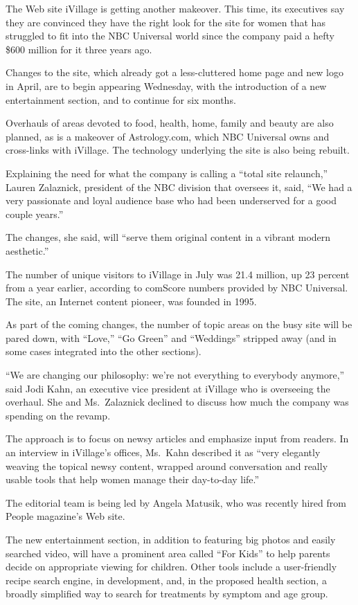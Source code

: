 ﻿\documentclass[12pt]{article}
\begin{document}
The Web site iVillage is getting another makeover. This time, its executives say they are convinced
they have the right look for the site for women that has struggled to fit into the NBC Universal
world since the company paid a hefty\cite{hefty} \$600 million for it three years ago.

Changes to the site, which already got a less-cluttered home page and new logo in April, are to
begin appearing Wednesday, with the introduction of a new entertainment section, and to continue for
six months.

Overhauls of areas devoted to food, health, home, family and beauty are also planned, as is a
makeover of Astrology.com, which NBC Universal owns and cross-links with iVillage. The technology
underlying the site is also being rebuilt.

Explaining the need for what the company is calling a ``total site relaunch,'' Lauren Zalaznick,
president of the NBC division that oversees it, said, ``We had a very passionate and loyal audience
base who had been underserved for a good couple years.''

The changes, she said, will ``serve them original content in a vibrant modern aesthetic.''

The number of unique visitors to iVillage in July was 21.4 million, up 23 percent from a year
earlier, according to comScore numbers provided by NBC Universal. The site, an Internet content
pioneer, was founded in 1995.

As part of the coming changes, the number of topic areas on the busy site will be pared down, with
``Love,'' ``Go Green'' and ``Weddings'' stripped away (and in some cases integrated into the other
sections).

``We are changing our philosophy: we're not everything to everybody anymore,'' said Jodi Kahn, an
executive vice president at iVillage who is overseeing the overhaul. She and Ms.~Zalaznick declined
to discuss how much the company was spending on the revamp\cite{revamp}.

The approach is to focus on newsy articles and emphasize input from readers. In an interview in
iVillage's offices, Ms.~Kahn described it as ``very elegantly weaving the topical newsy content,
wrapped around conversation and really usable tools that help women manage their day-to-day life.''

The editorial team is being led by Angela Matusik, who was recently hired from People magazine's Web
site.

The new entertainment section, in addition to featuring big photos and easily searched video, will
have a prominent area called ``For Kids'' to help parents decide on appropriate viewing for
children. Other tools include a user-friendly recipe search engine, in development, and, in the
proposed health section, a broadly simplified way to search for treatments by symptom and age group.
\end{document}
